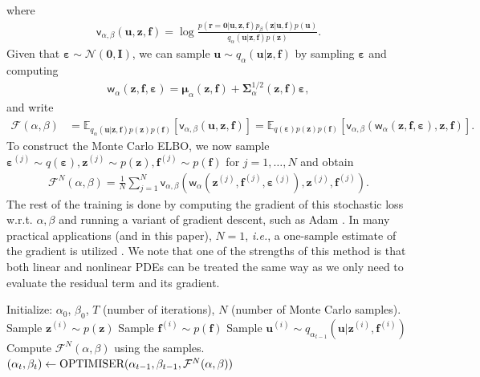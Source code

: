 \documentclass[11pt, fleqn]{article}
\def\cF{{\mathcal F}}
\def\z{{\mathbf z}}
\def\fbf{{\mathbf f}}
\def\ubf{{\mathbf u}}
\def\r{{\mathbf r}}
\def\cF{{\mathcal F}}
\def\bE{{\mathbb E}}
\def\NPDF{{\mathcal N}}
\def \bmu {{\boldsymbol \mu}}
\def \bSigma {{\mathbf \Sigma}}
\def \bvarepsilon {\boldsymbol \varepsilon}
\begin{document}
where
\begin{align}
    \mathsf{v}_{\alpha,\beta}(\ubf, \z, \fbf) = \log \frac{p(\r = \mathbf{0}|\ubf, \z, \fbf) p_{\beta}(\z | \ubf, \fbf) p(\ubf)}{q_{\alpha}(\ubf | \z, \fbf) p(\z)}.
\end{align}
Given that $\bvarepsilon \sim \NPDF(\mathbf{0}, \mathbf{I})$, we can sample $\ubf \sim q_\alpha(\ubf | \z, \fbf)$ by sampling $\bvarepsilon$ and computing
\begin{align}\label{eq:reparam_trick_dataless}
    \mathsf{w}_\alpha(\z, \fbf, \bvarepsilon) = \bmu_\alpha(\z, \fbf) + \bSigma^{1/2}_\alpha(\z, \fbf) \bvarepsilon,
\end{align}
and write
\begin{align}
        \cF(\alpha, \beta) &= \bE_{q_\alpha(\ubf | \z, \fbf) p(\z) p(\fbf)}[\mathsf{v}_{\alpha,\beta}(\ubf, \z, \fbf)]
        = \bE_{q(\bvarepsilon) p(\z) p(\fbf)}\left[\mathsf{v}_{\alpha,\beta}(\mathsf{w}_\alpha(\z, \fbf, \bvarepsilon), \z, \fbf)\right]\nonumber.
\end{align}
To construct the Monte Carlo \gls*{ELBO}, we now sample $\bvarepsilon^{(j)} \sim q(\bvarepsilon) , \z^{(j)} \sim  p(\z), \fbf^{(j)} \sim p(\fbf)$ for $j = 1,\ldots, N$ and obtain
\begin{align}\label{eq:MonteCarloElbo_dataless}
    \cF^N(\alpha, \beta) = \frac{1}{N}\sum_{j=1}^N \mathsf{v}_{\alpha,\beta}(\mathsf{w}_\alpha(\z^{(j)},\fbf^{(j)},\bvarepsilon^{(j)}), \z^{(j)}, \fbf^{(j)}).
\end{align}
The rest of the training is done by computing the gradient of this stochastic loss w.r.t. $\alpha,\beta$ and running a variant of gradient descent, such as Adam \cite{kingma2015adam}. In many practical applications (and in this paper), $N = 1$, \emph{i.e.}, a one-sample estimate of the gradient is utilized \cite{kingma2019introduction}. We note that one of the strengths of this method is that both linear and nonlinear PDEs can be treated the same way as we only need to evaluate the residual term and its gradient. 

\begin{algorithm}[h]
  \caption{Pseudocode for \gls*{PDDLVM}\label{alg:training}}
  \begin{algorithmic}
    \State Initialize: $\alpha_0$, $\beta_0$, $T$ (number of iterations), $N$ (number of Monte Carlo samples).
       
     
      \State Sample $\z^{(i)} \sim p(\z)$
      \State Sample $\fbf^{(i)} \sim p(\fbf)$
      \State Sample $\ubf^{(i)} \sim q_{\alpha_{t-1}}(\ubf | \z^{(i)}, \fbf^{(i)})$
     \EndFor
      \State Compute $\cF^N(\alpha, \beta)$ using the samples.  
      \State $(\alpha_t, \beta_t) \gets \textnormal{OPTIMISER}(\alpha_{t-1}, \beta_{t-1}, \cF^N(\alpha, \beta))$ 
    \EndFor
  \end{algorithmic}
\end{algorithm}
\end{document}
